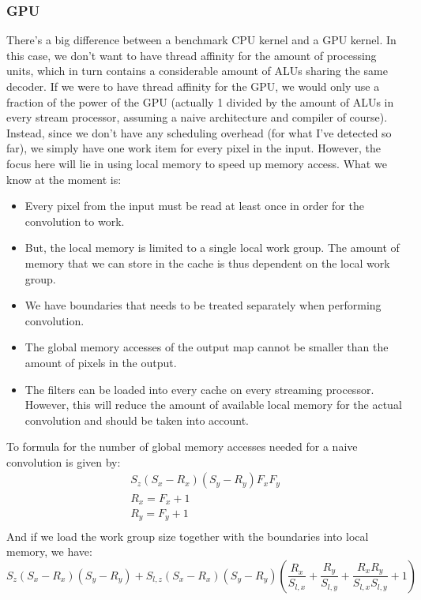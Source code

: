 \documentclass[a4paper,10pt]{article}
\theoremstyle{definition}
\begin{document}
\subsubsection{GPU}
There's a big difference between a benchmark CPU kernel and a GPU kernel. In this case, we don't want to have thread affinity for the amount of processing units, which in turn contains a considerable amount of ALUs sharing the same decoder. If we were to have thread affinity for the GPU, we would only use a fraction of the power of the GPU (actually 1 divided by the amount of ALUs in every stream processor, assuming a naive architecture and compiler of course). Instead, since we don't have any scheduling overhead (for what I've detected so far), we simply have one work item for every pixel in the input. However, the focus here will lie in using local memory to speed up memory access. What we know at the moment is:
\begin{itemize}
	\item Every pixel from the input must be read at least once in order for the convolution to work.
	\item But, the local memory is limited to a single local work group. The amount of memory that we can store in the cache is thus dependent on the local work group.
	\item We have boundaries that needs to be treated separately when performing convolution.
	\item The global memory accesses of the output map cannot be smaller than the amount of pixels in the output.
	\item The filters can be loaded into every cache on every streaming processor. However, this will reduce the amount of available local memory for the actual convolution and should be taken into account.
\end{itemize}
To formula for the number of global memory accesses needed for a naive convolution is given by:
\begin{gather*}
S_z(S_x - R_x)(S_y - R_y)F_xF_y\\
R_x = F_x + 1\\
R_y = F_y + 1\\
\end{gather*}
And if we load the work group size together with the boundaries into local memory, we have:
\begin{equation*}
S_z(S_x - R_x)(S_y - R_y) + S_{l,z}(S_x - R_x)(S_y - R_y) ( \frac{R_x}{S_{l,x}} + \frac{R_y}{S_{l,y}} + \frac{R_xR_y}{S_{l,x}S_{l,y}} + 1)
\end{equation*}
\end{document}
